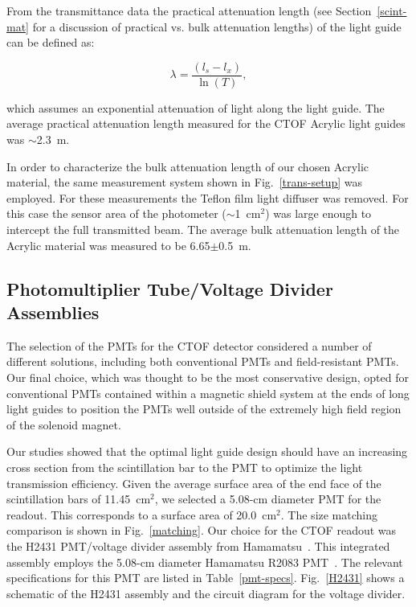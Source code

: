 \documentclass{elsart}
\begin{document}
From the transmittance data the practical attenuation length (see Section~\ref{scint-mat} 
for a discussion of practical vs. bulk attenuation lengths) of the light guide can be defined as:

\begin{equation}
\label{pracat}
\lambda= \frac{(l_s-l_x)}{\ln(T)},
\end{equation}

\noindent
which assumes an exponential attenuation of light along the light guide. The average practical 
attenuation length measured for the CTOF Acrylic light guides was $\sim$2.3~m.

In order to characterize the bulk attenuation length of our chosen Acrylic material, the
same measurement system shown in Fig.~\ref{trans-setup} was employed. For these measurements 
the Teflon film light diffuser was removed. For this case the sensor area of the photometer 
($\sim$1~cm$^2$) was large enough to intercept the full transmitted beam. The average bulk 
attenuation length of the Acrylic material was measured to be 6.65$\pm$0.5~m.

\subsection{Photomultiplier Tube/Voltage Divider Assemblies} 
\label{PMTs}

The selection of the PMTs for the CTOF detector considered a number of different solutions,
including both conventional PMTs and field-resistant PMTs. Our final choice, which was 
thought to be the most conservative design, opted for conventional PMTs contained within a
magnetic shield system at the ends of long light guides to position the PMTs well outside of
the extremely high field region of the solenoid magnet.

Our studies showed that the optimal light guide design should have an increasing cross
section from the scintillation bar to the PMT to optimize the light transmission efficiency.
Given the average surface area of the end face of the scintillation bars of 11.45~cm$^2$, we 
selected a 5.08-cm diameter PMT for the readout. This corresponds to a surface area of 
20.0~cm$^2$. The size matching comparison is shown in Fig.~\ref{matching}. Our choice for the 
CTOF readout was the H2431 PMT/voltage divider assembly from Hamamatsu~\cite{ham-ref}.
This integrated assembly employs the 5.08-cm diameter Hamamatsu R2083 PMT~\cite{r2083-ref}.
The relevant specifications for this PMT are listed in Table~\ref{pmt-specs}. Fig.~\ref{H2431}
shows a schematic of the H2431 assembly and the circuit diagram for the voltage divider.
\end{document}
